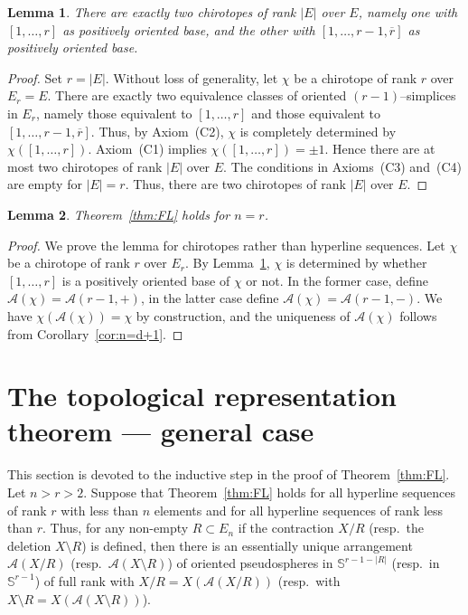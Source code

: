 \documentclass[a4paper]{amsart}
\newcommand{\p}{\mathbb S}
\newtheorem{lemma}{Lemma}
\theoremstyle{definition}
\theoremstyle{remark}
\begin{document}
\begin{lemma}\label{lem:n=r}
  There are exactly two chirotopes of  rank $|E|$ over $E$, namely one
  with $[ 1,\dots,  r]$ as positively oriented base, and
  the other with $[ 1,\dots,  {r-1}, \overline{ r}]$ as
  positively oriented base. 
\end{lemma}
\begin{proof}
  Set $r= |E|$. Without loss of generality, let $\chi$ be a chirotope of
  rank $r$ over $E_r=E$.
  There are exactly two equivalence classes of oriented
  $(r-1)$--simplices in $E_r$, namely those equivalent to $[ 1,\dots,
   r]$ and those equivalent to $[ 1,\dots, {r-1},
  \overline{ r}]$. 
%
  Thus, by Axiom~(C2), $\chi$ is completely determined by $\chi([
  1,\dots, r])$. 
  Axiom~(C1) implies  $\chi([ 1,\dots,  r])=\pm 1$. Hence there are at
  most two chirotopes of rank $|E|$ over $E$. 
  The conditions in Axioms~(C3) and~(C4) are empty for $|E|=r$. Thus,
  there are two chirotopes of rank $|E|$ over $E$. 
\end{proof}

\begin{lemma}\label{lem:FLbasecase_n=r}
  Theorem~\ref{thm:FL} holds for $n=r$.
\end{lemma}
\begin{proof}
  We prove the lemma for chirotopes rather than hyperline sequences.
  Let $\chi$ be a chirotope of rank $r$ over $E_r$.
  By Lemma~\ref{lem:n=r}, $\chi$ is determined by whether
  $[ 1,\dots, r]$ is a positively oriented base of $\chi$
  or not. In the former case, define $\mathcal A(\chi) = \mathcal
  A(r-1,+)$, in the latter case define $\mathcal A(\chi)= \mathcal
  A(r-1,-)$.
  We have $\chi(\mathcal A(\chi)) = \chi$ by construction, and the
  uniqueness of $\mathcal A(\chi)$ follows from Corollary~\ref{cor:n=d+1}. 
\end{proof}



\section{The topological representation theorem --- general case}
\label{sec:FLgeneral}

This section is devoted to the inductive step in the proof of
Theorem~\ref{thm:FL}. 
Let $n> r>2$. Suppose that Theorem~\ref{thm:FL} holds for all 
hyperline sequences of rank $r$ with less than $n$ elements and for all
hyperline sequences of rank less than $r$. 
%
Thus, for any non-empty $R\subset E_n$ if the contraction $X/R$ (resp.\ the
deletion $X\setminus R$) is defined, then there is  an essentially
unique arrangement $\mathcal A(X/R)$ (resp.\ $\mathcal A(X\setminus R)$) of
oriented pseudospheres in $\p^{r-1-|R|}$ (resp.\ in
$\p^{r-1}$) of full rank with $X/R=X(\mathcal A(X/R))$ (resp.\ with
$X\setminus R = X(\mathcal A(X\setminus R))$).  
\end{document}
